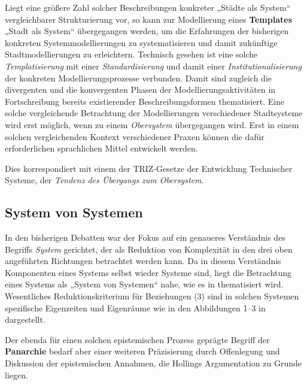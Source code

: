 \documentclass[11pt,a4paper]{article}
\begin{document}
Liegt eine größere Zahl solcher Beschreibungen konkreter „Städte als System“
vergleichbarer Strukturierung vor, so kann zur Modellierung eines
\textbf{Templates} „Stadt als System“ übergegangen werden, um die Erfahrungen
der bisherigen konkreten Systemmodellierungen zu systematisieren und damit
zukünftige Stadtmodellierungen zu erleichtern.  Technisch gesehen ist eine
solche \emph{Templatisierung} mit einer \emph{Standardisierung} und damit
einer \emph{Institutionalisierung} der konkreten Modellierungsprozesse
verbunden. Damit sind zugleich die divergenten und die konvergenten Phasen der
Modellierungsaktivitäten in Fortschreibung bereits existierender
Beschreibungsformen thematisiert.  Eine solche vergleichende Betrachtung der
Modellierungen verschiedener Stadtsysteme wird erst möglich, wenn zu einem
\emph{Obersystem} übergegangen wird. Erst in einem solchen vergleichenden
Kontext verschiedener Praxen können die dafür erforderlichen sprachlichen
Mittel entwickelt werden.

Dies korrespondiert mit einem der TRIZ-Gesetze der Entwicklung Technischer
Systeme, der \emph{Tendenz des Übergangs zum Obersystem}.

\subsection{System von Systemen}

In den bisherigen Debatten war der Fokus auf ein genaueres Verständnis des
Begriffs \emph{System} gerichtet, der als Reduktion von Komplexität in den
drei oben angeführten Richtungen betrachtet werden kann. Da in diesem
Verständnis Komponenten eines Systems selbst wieder Systeme sind, liegt die
Betrachtung eines Systems als „System von Systemen“ nahe, wie es in
\cite{Holling2000} thematisiert wird. Wesentliches Reduktionskriterium für
Beziehungen (3) sind in solchen Systemen spezifische Eigenzeiten und
Eigenräume wie in den Abbildungen 1--3 in \cite{Holling2000} dargestellt.

Der ebenda für einen solchen epistemischen Prozess geprägte Begriff der
\textbf{Panarchie} bedarf aber einer weiteren Präzisierung durch Offenlegung
und Diskussion der epistemischen Annahmen, die Hollings Argumentation zu
Grunde liegen.
\end{document}
